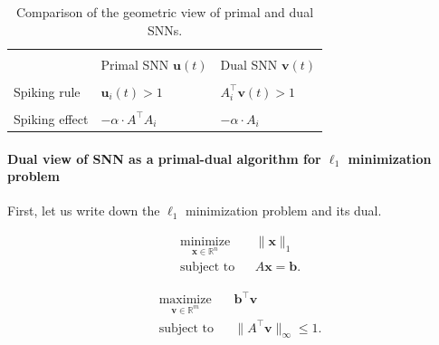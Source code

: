\documentclass[11pt]{article}
\theoremstyle{remark}
\theoremstyle{definition}
\newcommand{\bx}{\mathbf{x}}
\newcommand{\bb}{\mathbf{b}}
\newcommand{\bv}{\mathbf{v}}
\newcommand{\bu}{\mathbf{u}}
\newcommand{\R}{{\mathbb R}} %
\begin{document}
\begin{table}[h]
	\centering
	\begin{tabular}{|l|l|l|}
		\hline
		&&\\[-0.9em]
		& \multicolumn{1}{c|}{Primal SNN $\bu(t)$} & \multicolumn{1}{c|}{Dual SNN $\bv(t)$} \\[0.3em] \hline
		&&\\[-0.9em]
		Spiking rule   & $\bu_i(t)>1$                             & $A_i^\top\bv(t)>1$                     \\ [0.3em]\hline
		&&\\[-0.9em]
		Spiking effect & $-\alpha\cdot A^\top A_i$                & $-\alpha\cdot A_i$                      \\[0.3em] \hline
	\end{tabular}
	\caption{Comparison of the geometric view of primal and dual SNNs.}
	\label{table:geometric}
\end{table}


\paragraph{Dual view of SNN as a primal-dual algorithm for $\ell_1$ minimization problem}
First, let us write down the $\ell_1$ minimization problem and its dual. 

\vspace{3mm}
\begin{minipage}{\linewidth}
	\begin{minipage}{0.45\linewidth}
		\begin{equation*}
		\begin{aligned}
		& \underset{\bx\in\R^n}{\text{minimize}}
		& & \|\bx\|_1 \\
		& \text{subject to}
		& & A\bx=\bb.
		\end{aligned}
		\end{equation*}
	\end{minipage}
	\begin{minipage}{0.45\linewidth}
		\begin{equation*}
		\begin{aligned}
		& \underset{\bv\in\R^m}{\text{maximize}}
		& & \bb^{\top}\bv \\
		& \text{subject to}
		& & \|A^{\top}\bv\|_{\infty}\leq1.
		\end{aligned}
		\end{equation*}
	\end{minipage}
\end{minipage}
\vspace{3mm}
\end{document}
